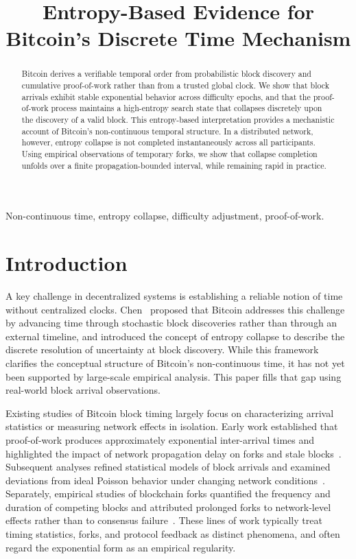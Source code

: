 \documentclass[conference]{IEEEtran}
\title{Entropy-Based Evidence for Bitcoin’s Discrete Time Mechanism}
\author{
    \IEEEauthorblockN{Bin Chen\IEEEauthorrefmark{1}\thanks{Corresponding author. Email: bchen@szu.edu.cn}}
    \IEEEauthorblockA{
        School of Electronics and Information Engineering,\\
        Shenzhen University\\
        bchen@szu.edu.cn
    }
    \and
    \IEEEauthorblockN{Pan Feng}
    \IEEEauthorblockA{
        School of Electronics and Information Engineering,\\
        Shenzhen University
    }
}
\begin{document}
\maketitle


\begin{abstract}
Bitcoin derives a verifiable temporal order from probabilistic block discovery
and cumulative proof-of-work rather than from a trusted global clock. 
We show
that block arrivals exhibit stable exponential behavior across difficulty
epochs, and that the proof-of-work process maintains a high-entropy search
state that collapses discretely upon the discovery of a valid block. This
entropy-based interpretation provides a mechanistic account of Bitcoin’s
non-continuous temporal structure. In a distributed network, however, entropy
collapse is not completed instantaneously across all participants. Using
empirical observations of temporary forks, we show that collapse completion
unfolds over a finite propagation-bounded interval, while remaining rapid in
practice.

\end{abstract}

\begin{IEEEkeywords}
Non-continuous time, entropy collapse, difficulty adjustment, proof-of-work.
\end{IEEEkeywords}



\section{Introduction}

A key challenge in decentralized systems is establishing a reliable notion of
time without centralized clocks. Chen~\cite{chen2025noncontinuous} proposed that
Bitcoin addresses this challenge by advancing time through stochastic block
discoveries rather than through an external timeline, and introduced the concept
of entropy collapse to describe the discrete resolution of uncertainty at block
discovery. While this framework clarifies the conceptual structure of Bitcoin’s
non-continuous time, it has not yet been supported by large-scale empirical
analysis. This paper fills that gap using real-world block arrival observations.

Existing studies of Bitcoin block timing largely focus on characterizing arrival
statistics or measuring network effects in isolation. Early work established
that proof-of-work produces approximately exponential inter-arrival times and
highlighted the impact of network propagation delay on forks and stale
blocks~\cite{nakamoto2008,decker2013information}. Subsequent analyses refined
statistical models of block arrivals and examined deviations from ideal Poisson
behavior under changing network conditions~\cite{bowden2018blockarrivals,
bowden2020modeling}. Separately, empirical studies of blockchain forks quantified
the frequency and duration of competing blocks and attributed prolonged forks to
network-level effects rather than to consensus failure~\cite{neudecker2019forks}.
These lines of work typically treat timing statistics, forks, and protocol
feedback as distinct phenomena, and often regard the exponential form as an
empirical regularity.
\end{document}

